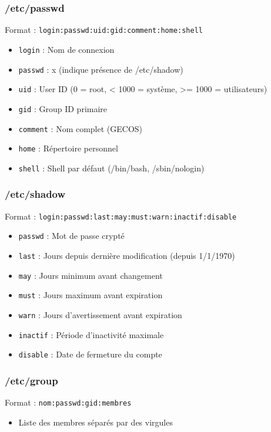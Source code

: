 \documentclass[12pt,a4paper]{article}
\begin{document}
\subsubsection{/etc/passwd}
Format : \texttt{login:passwd:uid:gid:comment:home:shell}
\begin{itemize}
    \item \texttt{login} : Nom de connexion
    \item \texttt{passwd} : x (indique présence de /etc/shadow)
    \item \texttt{uid} : User ID (0 = root, < 1000 = système, >= 1000 = utilisateurs)
    \item \texttt{gid} : Group ID primaire
    \item \texttt{comment} : Nom complet (GECOS)
    \item \texttt{home} : Répertoire personnel
    \item \texttt{shell} : Shell par défaut (/bin/bash, /sbin/nologin)
\end{itemize}

\subsubsection{/etc/shadow}
Format : \texttt{login:passwd:last:may:must:warn:inactif:disable}
\begin{itemize}
    \item \texttt{passwd} : Mot de passe crypté
    \item \texttt{last} : Jours depuis dernière modification (depuis 1/1/1970)
    \item \texttt{may} : Jours minimum avant changement
    \item \texttt{must} : Jours maximum avant expiration
    \item \texttt{warn} : Jours d'avertissement avant expiration
    \item \texttt{inactif} : Période d'inactivité maximale
    \item \texttt{disable} : Date de fermeture du compte
\end{itemize}

\subsubsection{/etc/group}
Format : \texttt{nom:passwd:gid:membres}
\begin{itemize}
    \item Liste des membres séparés par des virgules
\end{itemize}
\end{document}
